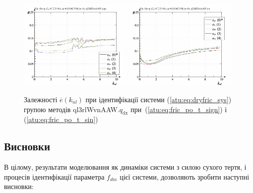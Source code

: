 \begin{figure}[htb!]
  \centerline{
    \includegraphics[width=0.49\textwidth]{p/cha/fric/ql3rlWvnAAW/fric_id-p_k_nl_sign.png}
    \hfill
    \includegraphics[width=0.49\textwidth]{p/cha/fric/ql3rlWvnAAW/fric_id-p_k_nl_sin.png}
  }
\caption{Залежності $ \overline{e} (k_{nl}) $ при ідентифікації системи (\ref{atu:eq:dryfric_sys}) групою методів ql3rlWvnAAW.$q_\mathrm{dx} $ при~(\ref{atu:eq:fric_po_t_sign}) і (\ref{atu:eq:fric_po_t_sin})}
\label{atu:f:fric_k_nl_ql3rlWvnAAW_q_dx}
\end{figure}



\subsection{Висновки}%

В цілому, результати моделювання як динаміки системи з силою
сухого тертя, і процесів ідентифікації параметра
$ f_{dm} $ цієї системи, дозволяють зробити наступні висновки:

